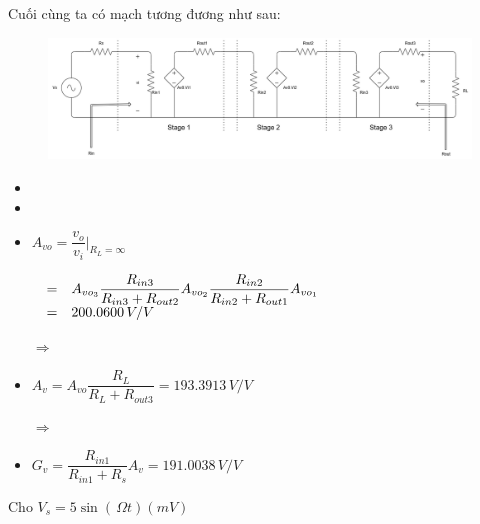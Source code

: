 \noindent Cuối cùng ta có mạch tương đương như sau:

\begin{figure}[H]
	\centering
	\includegraphics[width=.9\linewidth]{./my-chapters/my-diagrams/Question6/caub_1.png}
\end{figure}

\begin{itemize}[label =-]
	\item {}
	\item {}
	\item $A_{vo} = \dfrac{v_{o}}{v_{i}}|_{R_{L} = \infty}$
	
	$\begin{matrix}
			   & = & A_{vo_{3}} \dfrac{R_{in3}}{R_{in3} + R_{out2}} A_{vo_{2}} \dfrac{R_{in2}}{R_{in2} + R_{out1}}A_{vo_{1}} \hfill\\
			   & = & 200.0600 \, V/V \hfill
	\end{matrix}$
	
	$\Rightarrow$ 

	\item $A_{v} = A_{vo} \dfrac{R_{L}}{R_{L} + R_{out3}} = 193.3913\, V/V$
	
	$\Rightarrow$ 
	\item $G_{v} = \dfrac{R_{in1}}{R_{in1} + R_{s}} A_{v} = 191.0038\, V/V$
\end{itemize}


\noindent Cho $V_{s} = 5\sin\left(\,\Omega t\right) (mV)$